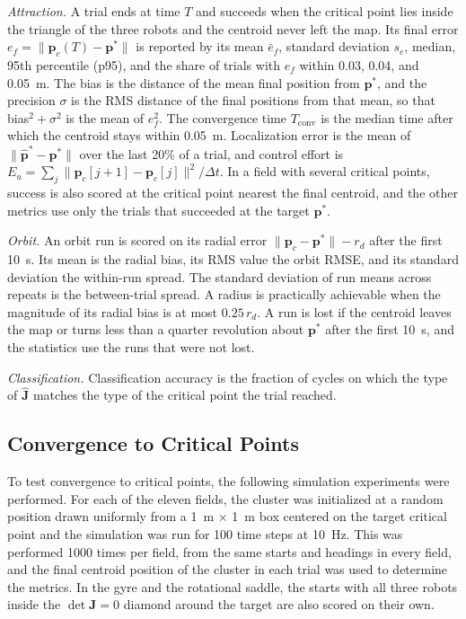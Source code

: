 \documentclass[lettersize,journal]{IEEEtran}
\begin{document}
\emph{Attraction.} A trial ends at time $T$ and succeeds when the critical point lies inside the triangle of the three robots and the centroid never left the map. Its final error $e_f = \|\mathbf{p}_c(T) - \mathbf{p}^*\|$ is reported by its mean $\bar{e}_f$, standard deviation $s_e$, median, 95th percentile (p95), and the share of trials with $e_f$ within 0.03, 0.04, and 0.05~m. The bias is the distance of the mean final position from $\mathbf{p}^*$, and the precision $\sigma$ is the RMS distance of the final positions from that mean, so that bias$^2 + \sigma^2$ is the mean of $e_f^2$. The convergence time $T_{\mathrm{conv}}$ is the median time after which the centroid stays within 0.05~m. Localization error is the mean of $\|\hat{\mathbf{p}}^* - \mathbf{p}^*\|$ over the last 20\% of a trial, and control effort is $E_u = \sum_j \|\mathbf{p}_c[j+1] - \mathbf{p}_c[j]\|^2/\Delta t$. In a field with several critical points, success is also scored at the critical point nearest the final centroid, and the other metrics use only the trials that succeeded at the target $\mathbf{p}^*$.

\emph{Orbit.} An orbit run is scored on its radial error $\|\mathbf{p}_c - \mathbf{p}^*\| - r_d$ after the first 10~s. Its mean is the radial bias, its RMS value the orbit RMSE, and its standard deviation the within-run spread. The standard deviation of run means across repeats is the between-trial spread. A radius is practically achievable when the magnitude of its radial bias is at most $0.25\,r_d$. A run is lost if the centroid leaves the map or turns less than a quarter revolution about $\mathbf{p}^*$ after the first 10~s, and the statistics use the runs that were not lost.

\emph{Classification.} Classification accuracy is the fraction of cycles on which the type of $\hat{\mathbf{J}}$ matches the type of the critical point the trial reached.

\subsection{Convergence to Critical Points}

To test convergence to critical points, the following simulation experiments were performed. For each of the eleven fields, the cluster was initialized at a random position drawn uniformly from a 1~m $\times$ 1~m box centered on the target critical point and the simulation was run for 100 time steps at 10~Hz. This was performed 1000 times per field, from the same starts and headings in every field, and the final centroid position of the cluster in each trial was used to determine the metrics. In the gyre and the rotational saddle, the starts with all three robots inside the $\det\mathbf{J} = 0$ diamond around the target are also scored on their own.
\end{document}

